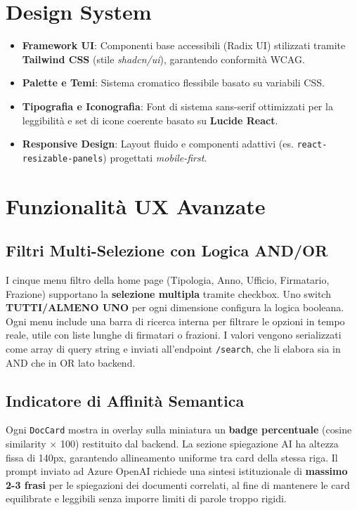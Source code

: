 \documentclass[12pt,a4paper,oneside]{report}
\begin{document}
\section{Design System}

\begin{itemize}
    \item \textbf{Framework UI}: Componenti base accessibili (Radix UI) stilizzati tramite \textbf{Tailwind CSS} (stile \textit{shadcn/ui}), garantendo conformit\`{a} WCAG.
    \item \textbf{Palette e Temi}: Sistema cromatico flessibile basato su variabili CSS.
    \item \textbf{Tipografia e Iconografia}: Font di sistema sans-serif ottimizzati per la leggibilit\`{a} e set di icone coerente basato su \textbf{Lucide React}.
    \item \textbf{Responsive Design}: Layout fluido e componenti adattivi (es. \texttt{react-resizable-panels}) progettati \textit{mobile-first}.
\end{itemize}

\section{Funzionalit\`{a} UX Avanzate}

\subsection{Filtri Multi-Selezione con Logica AND/OR}

I cinque menu filtro della home page (Tipologia, Anno, Ufficio, Firmatario, Frazione)
supportano la \textbf{selezione multipla} tramite checkbox. Uno switch \textbf{TUTTI/ALMENO UNO}
per ogni dimensione configura la logica booleana. Ogni menu include una barra di ricerca
interna per filtrare le opzioni in tempo reale, utile con liste lunghe di firmatari o frazioni.
I valori vengono serializzati come array di query string e inviati all'endpoint \texttt{/search},
che li elabora sia in AND che in OR lato backend.

\subsection{Indicatore di Affinit\`{a} Semantica}

Ogni \texttt{DocCard} mostra in overlay sulla miniatura un \textbf{badge percentuale}
(cosine similarity $\times$ 100) restituito dal backend. La sezione spiegazione AI ha
altezza fissa di 140px, garantendo allineamento uniforme tra card della stessa riga.
Il prompt inviato ad Azure OpenAI richiede una sintesi istituzionale di \textbf{massimo 2-3 frasi} per le spiegazioni dei documenti correlati, al fine di mantenere le card equilibrate e leggibili senza imporre limiti di parole troppo rigidi.
\end{document}
